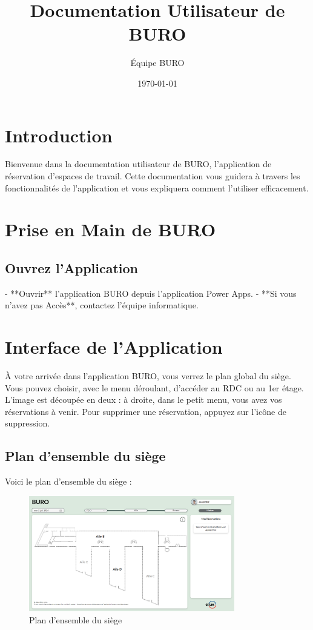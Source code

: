 \documentclass{article}
\title{\textbf{\Huge{\textcolor{myblue}{Documentation Utilisateur de BURO}}}}
\author{Équipe BURO}
\date{\today}
\begin{document}
\maketitle

\tableofcontents
\newpage

\section{Introduction}
Bienvenue dans la documentation utilisateur de BURO, l'application de réservation d'espaces de travail. Cette documentation vous guidera à travers les fonctionnalités de l'application et vous expliquera comment l'utiliser efficacement.

\section{Prise en Main de BURO}

\subsection{Ouvrez l'Application}
- **Ouvrir** l'application BURO depuis l'application Power Apps.  
- **Si vous n'avez pas Accès**, contactez l'équipe informatique.

\par

\section{Interface de l'Application}
À votre arrivée dans l'application BURO, vous verrez le plan global du siège. Vous pouvez choisir, avec le menu déroulant, d'accéder au RDC ou au 1er étage. L'image est découpée en deux : à droite, dans le petit menu, vous avez vos réservations à venir. Pour supprimer une réservation, appuyez sur l'icône de suppression.

\subsection{Plan d'ensemble du siège}
Voici le plan d'ensemble du siège :

\begin{figure}[h]
\centering
\includegraphics[width=0.8\textwidth]{./Img/BURO_Accueil.png}
\caption{Plan d'ensemble du siège}
\end{figure}
\end{document}
